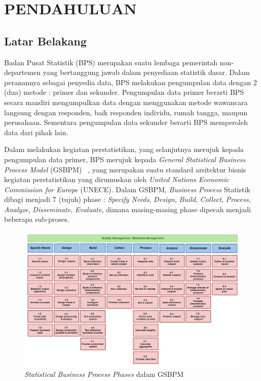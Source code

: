 \chapter{PENDAHULUAN}
\section{Latar Belakang}
Badan Pusat Statistik (BPS) merupakan suatu lembaga pemerintah non-departemen yang bertanggung jawab dalam penyediaan statistik dasar. Dalam peranannya sebagai penyedia data, BPS melakukan pengumpulan data dengan 2 (dua) metode : primer dan sekunder. Pengumpulan data primer berarti BPS secara mandiri mengumpulkan data dengan menggunakan metode wawancara langsung dengan responden, baik responden individu, rumah tangga, maupun perusahaan. Sementara pengumpulan data sekunder berarti BPS memperoleh data dari pihak lain.

Dalam melakukan kegiatan perstatistikan, yang selanjutnya merujuk kepada pengumpulan data primer, BPS merujuk kepada \textit{General Statistical Business Process Model} (GSBPM) ~\cite{_gsbpm_????}, yang merupakan suatu standard arsitektur bisnis kegiatan perstatistikan yang dirumuskan oleh \textit{United Nations Economic Commission for Europe} (UNECE). Dalam GSBPM, \textit{Business Process} Statistik dibagi menjadi 7 (tujuh) phase : \textit{Specify Needs}, \textit{Design}, \textit{Build}, \textit{Collect}, \textit{Process}, \textit{Analyze}, \textit{Disseminate}, \textit{Evaluate}, dimana masing-masing phase dipecah menjadi beberapa sub-proses.

\begin{figure}
    \centering
    \includegraphics[width=13cm]{../../Resources/Images/gsbpm}
    \caption{\textit{Statistical Business Process Phases} dalam GSBPM}
    \label{fig:gsbpm}
\end{figure}

